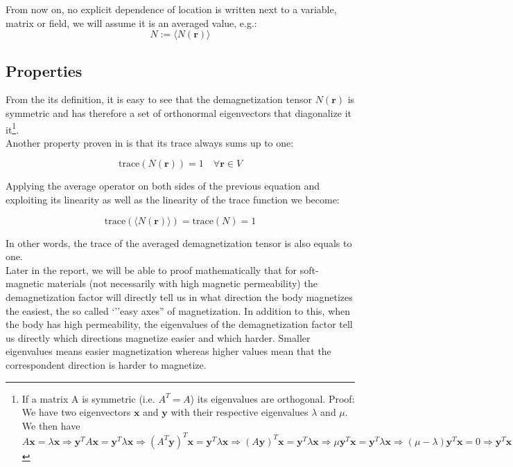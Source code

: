 From now on, no explicit dependence of location is written next to a variable, matrix or field, we will assume it is an averaged value, e.g.:
\begin{equation}
N := \langle N(\textbf{r}) \rangle
\end{equation}


\subsection{Properties}

From the its definition, it is easy to see that the demagnetization tensor $N(\textbf{r})$ is symmetric and has therefore a set of orthonormal eigenvectors that diagonalize it it\footnote{If a matrix A is symmetric (i.e. $A^T = A$) its eigenvalues are orthogonal. Proof: We have two eigenvectors $\textbf{x}$ and $\textbf{y}$ with their respective eigenvalues $\lambda$ and $\mu$. We then have $A\textbf{x} = \lambda\textbf{x} \Rightarrow \textbf{y}^TA\textbf{x} = \textbf{y}^T \lambda\textbf{x} \Rightarrow (A^T\textbf{y})^T\textbf{x} = \textbf{y}^T \lambda\textbf{x}  \Rightarrow (A\textbf{y})^T\textbf{x} = \textbf{y}^T \lambda\textbf{x}  \Rightarrow \mu\textbf{y}^T\textbf{x} = \textbf{y}^T \lambda\textbf{x} \Rightarrow (\mu - \lambda)\textbf{y}^T\textbf{x} = 0 \Rightarrow \textbf{y}^T\textbf{x} = 0 $ }. \\

Another property proven in \cite{Schlomann1962} is that its trace always sums up to one:

\begin{equation}
\text{trace}(N(\textbf{r})) = 1 \quad \forall \textbf{r} \in V
\end{equation}

 Applying the average operator on both sides of the previous equation and exploiting its linearity as well as the linearity of the trace function we become:

\begin{equation}
\text{trace}(\langle N(\textbf{r})\rangle) = \text{trace}(N)= 1
\end{equation}

In other words, the trace of the averaged demagnetization tensor is also equals to one.\\

Later in the report, we will be able to proof mathematically that for soft-magnetic materials (not necessarily with high magnetic permeability) the demagnetization factor will directly tell us in what direction the body magnetizes the easiest, the so called `''easy axes'' of magnetization. In addition to this, when the body has high permeability, the eigenvalues of the demagnetization factor tell us directly which directions magnetize easier and which harder. Smaller eigenvalues means easier magnetization whereas higher values mean that the correspondent direction is harder to magnetize.

